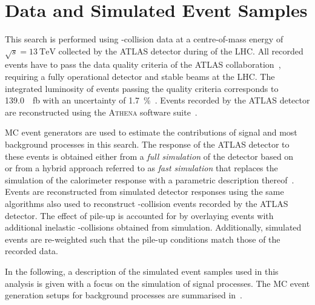 \section{Data and Simulated Event Samples}
\label{sec:data_and_simulation}

This search is performed using \pp-collision data at a centre-of-mass energy of
$\sqrt{s} = \SI{13}{\TeV}$ collected by the ATLAS detector during \RunTwo of the
LHC. All recorded events have to pass the data quality criteria of the ATLAS
collaboration~\cite{DAPR-2018-01}, requiring a fully operational detector and
stable beams at the LHC. The integrated luminosity of events passing the quality
criteria corresponds to \SI{139.0}{\per\femto\barn} with an uncertainty of
\SI{1.7}{\percent}~\cite{ATLAS-CONF-2019-021}. Events recorded by the ATLAS
detector are reconstructed using the \textsc{Athena} software
suite~\cite{ATL-SOFT-PUB-2021-001}.


MC event generators are used to estimate the contributions of signal and most
background processes in this search. The response of the ATLAS detector to these
events is obtained either from a \emph{full simulation} of the detector based on
\GEANT~\cite{SOFT-2010-01,Agostinelli:2002hh} or from a hybrid approach referred
to as \emph{fast simulation} that replaces the simulation of the calorimeter
response with a parametric description thereof~\cite{SOFT-2010-01}. Events are
reconstructed from simulated detector responses using the same algorithms also
used to reconstruct \pp-collision events recorded by the ATLAS detector. The
effect of pile-up is accounted for by overlaying events with additional
inelastic \pp-collisions obtained from simulation. Additionally, simulated
events are re-weighted such that the pile-up conditions match those of the
recorded data.

In the following, a description of the simulated event samples used in this
analysis is given with a focus on the simulation of signal processes. The MC
event generation setups for background processes are summarised
in~.

